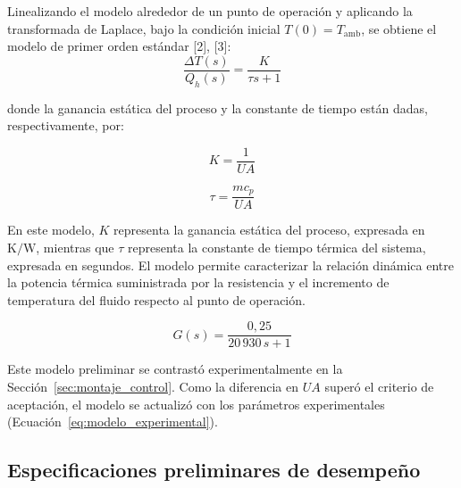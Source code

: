 Linealizando el modelo alrededor de un punto de operación y aplicando la transformada de Laplace, bajo la condición inicial $T(0)=T_{\mathrm{amb}}$, se obtiene el modelo de primer orden estándar [2], [3]:
\begin{equation}
\frac{\Delta T(s)}{Q_h(s)} = \frac{K}{\tau s+1}
\end{equation}

donde la ganancia estática del proceso y la constante de tiempo están dadas, respectivamente, por:

\begin{equation}
K=\frac{1}{UA}
\end{equation}

\begin{equation}
\tau=\frac{m c_p}{UA}
\end{equation}

En este modelo, $K$ representa la ganancia estática del proceso, expresada en $\mathrm{K/W}$, mientras que $\tau$ representa la constante de tiempo térmica del sistema, expresada en segundos. El modelo permite caracterizar la relación dinámica entre la potencia térmica suministrada por la resistencia y el incremento de temperatura del fluido respecto al punto de operación.

\begin{equation}
\boxed{
G(s)=\frac{0{,}25}{20\,930\,s+1}
}
\end{equation}

Este modelo preliminar se contrastó experimentalmente en la Sección~\ref{sec:montaje_control}. Como la diferencia en $UA$ superó el criterio de aceptación, el modelo se actualizó con los parámetros experimentales (Ecuación~\ref{eq:modelo_experimental}).

\subsection{Especificaciones preliminares de desempeño}



